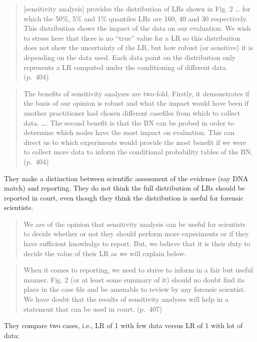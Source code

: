 \documentclass[
  10pt,
  dvipsnames,enabledeprecatedfontcommands]{scrartcl}
\begin{document}
\begin{quote}
{[}sensitivity analysis{]} provides the distribution of LRs shown in
Fig. 2 \ldots{} for which the 50\%, 5\% and 1\% quantiles LRs are 160,
40 and 30 respectively. This distribution shows the impact of the data
on our evaluation. We wish to stress here that there is no ``true''
value for a LR so this distribution does not show the uncertainty of the
LR, but how robust (or sensitive) it is depending on the data used. Each
data point on the distribution only represents a LR computed under the
conditioning of different data. (p.~404)
\end{quote}

\begin{quote}
The benefits of sensitivity analyses are two-fold. Firstly, it
demonstrates if the basis of our opinion is robust and what the impact
would have been if another practitioner had chosen different casefiles
from which to collect data. \ldots. The second benefit is that the BN
can be probed in order to determine which nodes have the most impact on
evaluation. This can direct us to which experiments would provide the
most benefit if we were to collect more data to inform the conditional
probability tables of the BN. (p.~404)
\end{quote}

\noindent They make a distinction between scientific assessment of the
evidence (say DNA match) and reporting. They do not think the full
distribution of LRs should be reported in court, even though they think
the distribution is useful for forensic scientists.

\begin{quote}
We are of the opinion that sensitivity analysis can be useful for
scientists to decide whether or not they should perform more experiments
or if they have sufficient knowledge to report. But, we believe that it
is their duty to decide the value of their LR as we will explain below.
\end{quote}

\begin{quote}
When it comes to reporting, we need to strive to inform in a fair but
useful manner. Fig. 2 (or at least some summary of it) should no doubt
find its place in the case file and be amenable to review by any
forensic scientist. We have doubt that the results of sensitivity
analyses will help in a statement that can be used in court. (p.~407)
\end{quote}

\noindent They compare two cases, i.e., LR of 1 with few data versus LR
of 1 with lot of data:
\end{document}
